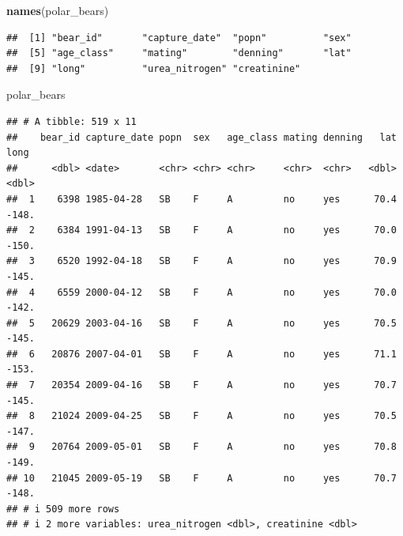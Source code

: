 \documentclass[
]{article}
\newenvironment{Shaded}{\begin{snugshade}}{\end{snugshade}}
\newcommand{\FunctionTok}[1]{\textcolor[rgb]{0.13,0.29,0.53}{\textbf{#1}}}
\newcommand{\NormalTok}[1]{#1}
\begin{document}
\begin{Shaded}
\begin{Highlighting}[]
\FunctionTok{names}\NormalTok{(polar\_bears)}
\end{Highlighting}
\end{Shaded}

\begin{verbatim}
##  [1] "bear_id"       "capture_date"  "popn"          "sex"          
##  [5] "age_class"     "mating"        "denning"       "lat"          
##  [9] "long"          "urea_nitrogen" "creatinine"
\end{verbatim}

\begin{Shaded}
\begin{Highlighting}[]
\NormalTok{polar\_bears}
\end{Highlighting}
\end{Shaded}

\begin{verbatim}
## # A tibble: 519 x 11
##    bear_id capture_date popn  sex   age_class mating denning   lat  long
##      <dbl> <date>       <chr> <chr> <chr>     <chr>  <chr>   <dbl> <dbl>
##  1    6398 1985-04-28   SB    F     A         no     yes      70.4 -148.
##  2    6384 1991-04-13   SB    F     A         no     yes      70.0 -150.
##  3    6520 1992-04-18   SB    F     A         no     yes      70.9 -145.
##  4    6559 2000-04-12   SB    F     A         no     yes      70.0 -142.
##  5   20629 2003-04-16   SB    F     A         no     yes      70.5 -145.
##  6   20876 2007-04-01   SB    F     A         no     yes      71.1 -153.
##  7   20354 2009-04-16   SB    F     A         no     yes      70.7 -145.
##  8   21024 2009-04-25   SB    F     A         no     yes      70.5 -147.
##  9   20764 2009-05-01   SB    F     A         no     yes      70.8 -149.
## 10   21045 2009-05-19   SB    F     A         no     yes      70.7 -148.
## # i 509 more rows
## # i 2 more variables: urea_nitrogen <dbl>, creatinine <dbl>
\end{verbatim}
\end{document}
